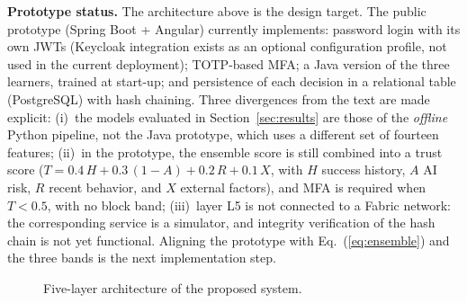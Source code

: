\documentclass[conference]{IEEEtran}
\begin{document}
\textbf{Prototype status.} The architecture above is the design target.
The public prototype (Spring Boot + Angular) currently implements:
password login with its own JWTs (Keycloak integration exists as an
optional configuration profile, not used in the current deployment);
TOTP-based MFA; a Java version of the three learners, trained at start-up;
and persistence of each decision in a relational table (PostgreSQL) with
hash chaining. Three divergences from the text are made explicit:
(i)~the models evaluated in Section~\ref{sec:results} are those of the
\emph{offline} Python pipeline, not the Java prototype, which uses a
different set of fourteen features; (ii)~in the prototype, the ensemble
score is still combined into a trust score
($T = 0.4\,H + 0.3\,(1-A) + 0.2\,R + 0.1\,X$, with $H$ success history,
$A$ AI risk, $R$ recent behavior, and $X$ external factors), and MFA is
required when $T<0.5$, with no block band; (iii)~layer L5 is not
connected to a Fabric network: the corresponding service is a simulator,
and integrity verification of the hash chain is not yet functional.
Aligning the prototype with Eq.~(\ref{eq:ensemble}) and the three bands
is the next implementation step.

\begin{figure}[t]
\centering
{}
\caption{Five-layer architecture of the proposed system.}
\label{fig:arch}
\end{figure}
\end{document}
